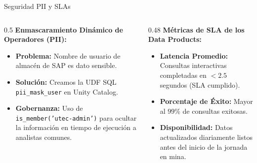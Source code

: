 \documentclass[aspectratio=169,10pt]{beamer}
\begin{document}
\begin{frame}{Seguridad PII y SLAs}
    \begin{columns}
        \begin{column}{0.5\textwidth}
            \textbf{Enmascaramiento Dinámico de Operadores (PII):}
            \begin{itemize}
                \setlength{\itemsep}{0.4em}
                \item \textbf{Problema:} Nombre de usuario de almacén de SAP es dato sensible.
                \item \textbf{Solución:} Creamos la UDF SQL \texttt{pii\_mask\_user} en Unity Catalog.
                \item \textbf{Gobernanza:} Uso de \texttt{is\_member('utec-admin')} para ocultar la información en tiempo de ejecución a analistas comunes.
            \end{itemize}
        \end{column}
        \begin{column}{0.48\textwidth}
            \textbf{Métricas de SLA de los Data Products:}
            \begin{itemize}
                \setlength{\itemsep}{0.4em}
                \item \textbf{Latencia Promedio:} Consultas interactivas completadas en $<2.5$ segundos (SLA cumplido).
                \item \textbf{Porcentaje de Éxito:} Mayor al $99\%$ de consultas exitosas.
                \item \textbf{Disponibilidad:} Datos actualizados diariamente listos antes del inicio de la jornada en mina.
            \end{itemize}
        \end{column}
    \end{columns}
\end{frame}
\end{document}
